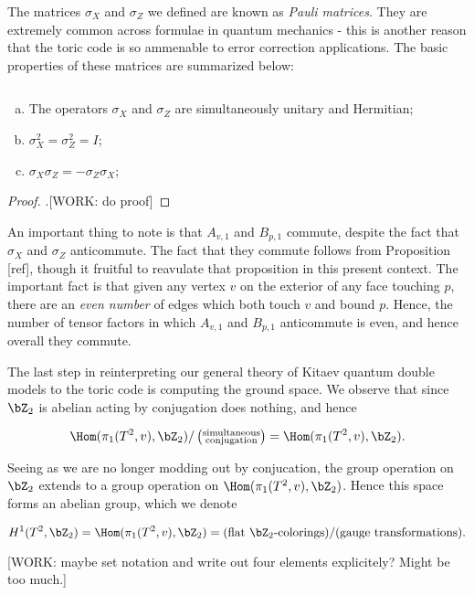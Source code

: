 The matrices $\sigma_X$ and $\sigma_Z$ we defined are known as \textit{Pauli matrices}. They are extremely common across formulae in quantum mechanics - this is another reason that the toric code is so ammenable to error correction applications. The basic properties of these matrices are summarized below:

\begin{prop}$\,$
\begin{enumerate}[(a)]
\item The operators $\sigma_X$ and $\sigma_Z$ are simultaneously unitary and Hermitian;
\item $\sigma_X^2=\sigma_Z^2=I$;
\item $\sigma_X \sigma_Z = - \sigma_Z \sigma_X$;
\end{enumerate}
\end{prop}
\begin{proof}.[WORK: do proof]
\end{proof}

An important thing to note is that $A_{v,1}$ and $B_{p,1}$ commute, despite the fact that $\sigma_X$ and $\sigma_Z$ anticommute. The fact that they commute follows from Proposition [ref], though it fruitful to reavulate that proposition in this present context. The important fact is that given any vertex $v$ on the exterior of any face touching $p$,  there are an \textit{even number} of edges which both touch $v$ and bound $p$. Hence, the number of tensor factors in which $A_{v,1}$ and $B_{p,1}$ anticommute is even, and hence overall they commute.

The last step in reinterpreting our general theory of Kitaev quantum double models to the toric code is computing the ground space. We observe that since $\bZ_2$ is abelian acting by conjugation does nothing, and hence

$$\Hom(\pi_1(T^2,v), \bZ_2)/\left(\substack{\text{simultaneous} \\ \text{conjugation}}\right)=\Hom(\pi_1(T^2,v), \bZ_2).$$

Seeing as we are no longer modding out by conjucation, the group operation on $\bZ_2$ extends to a group operation on $\Hom(\pi_1(T^2,v), \bZ_2)$. Hence this space forms an abelian group, which we denote

$$H^1(T^2,\bZ_2)=\Hom(\pi_1(T^2,v), \bZ_2)=(\text{flat $\bZ_2$-colorings})/(\text{gauge transformations}).$$

[WORK: maybe set notation and write out four elements explicitely? Might be too much.]

